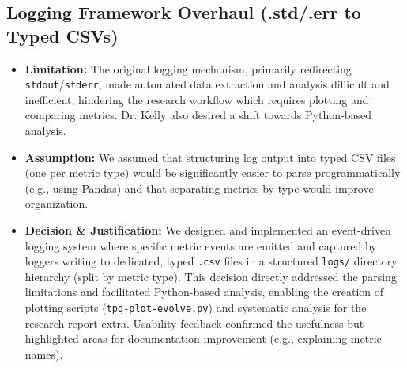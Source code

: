 \documentclass{article}
\begin{document}
\subsection{Logging Framework Overhaul (.std/.err to Typed CSVs)}
\begin{itemize}
    \item \textbf{Limitation:} The original logging mechanism, primarily redirecting \texttt{stdout}/\texttt{stderr}, made automated data extraction and analysis difficult and inefficient, hindering the research workflow which requires plotting and comparing metrics. Dr. Kelly also desired a shift towards Python-based analysis.
    \item \textbf{Assumption:} We assumed that structuring log output into typed CSV files (one per metric type) would be significantly easier to parse programmatically (e.g., using Pandas) and that separating metrics by type would improve organization.
    \item \textbf{Decision \& Justification:} We designed and implemented an event-driven logging system where specific metric events are emitted and captured by loggers writing to dedicated, typed \texttt{.csv} files in a structured \texttt{logs/} directory hierarchy (split by metric type). This decision directly addressed the parsing limitations and facilitated Python-based analysis, enabling the creation of plotting scripts (\texttt{tpg-plot-evolve.py}) and systematic analysis for the research report extra. Usability feedback confirmed the usefulness but highlighted areas for documentation improvement (e.g., explaining metric names).
\end{itemize}
\end{document}
